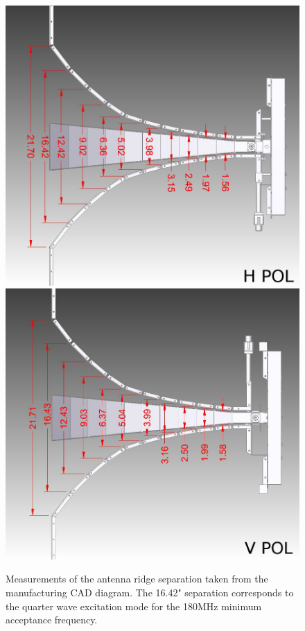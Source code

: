 \begin{figure}
\centering
	\includegraphics[height=0.45\textheight]{figures/SEAVEY_H_RIDGE}
	\includegraphics[height=0.45\textheight]{figures/SEAVEY_V_RIDGE}
	\caption{Measurements of the antenna ridge separation taken from the manufacturing CAD diagram.  The 16.42" separation corresponds to the quarter wave excitation mode for the 180MHz minimum acceptance frequency.}
	\label{fig:antRidges}
\end{figure}	
	

